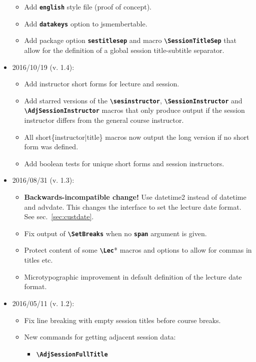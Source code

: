 \documentclass[english]{article}
\newcommand*\jmacro[1]{\textbf{\texttt{#1}}}
\newcommand*\jcsmacro[1]{\jmacro{\textbackslash{#1}}}
\newcommand*\joption[1]{\textbf{\texttt{#1}}}
\newcommand*\jsmt{\textsf{jsmembertable}}
\begin{document}
\begin{itemize}
\begin{itemize}
		\item Add \joption{english} style file (proof of concept).
		\item Add \joption{datakeys} option to \jsmt.
		\item Add package option \joption{sestitlesep} and macro \jcsmacro{SessionTitleSep} that
		allow for the definition of a global session title-subtitle	separator.
	\end{itemize}
\item 2016/10/19 (v. 1.4):
	\begin{itemize}
		\item Add instructor short forms for lecture and session.
		\item Add starred versions of the \jcsmacro{sesinstructor}, \jcsmacro{SessionInstructor} and \jcsmacro{AdjSessionInstructor} macros that only produce output if the session instructor differs from the general course instructor.
		\item All short\{instructor|title\} macros now output the long version if no short form was defined.
		\item Add boolean tests for unique short forms and session instructors.
	\end{itemize}
\item 2016/08/31 (v. 1.3):
     \begin{itemize}
     	\item \textbf{Backwards-incompatible change!} Use \textsf{datetime2} instead of \textsf{datetime} and \textsf{advdate}.
     	      This changes the interface to set the lecture date format. See sec.~\ref{sec:custdate}.
     	\item Fix output of \jcsmacro{SetBreaks} when no \joption{span} argument is given.
     	\item Protect content of some \jcsmacro{Lec}* macros and options to allow for commas in
     	      titles etc.
        \item Microtypographic improvement in default definition of the lecture date format.
	 \end{itemize}
\item 2016/05/11 (v. 1.2):
    \begin{itemize}	
	\item Fix line breaking with empty session titles before course breaks. 
	\item New commands for getting adjacent session data:
	   \begin{itemize}	
		  \item \jcsmacro{AdjSessionFullTitle}

\end{itemize}
\end{itemize}
\end{itemize}
\end{document}
